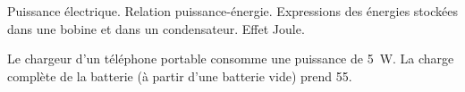 \begin{prerequis}
	Puissance électrique. Relation puissance-énergie. Expressions des énergies stockées dans une bobine et dans un condensateur. Effet Joule.
\end{prerequis}













\hauteurLargeurCadreReponse		{8mm}{2.5cm}
\initialisationEntrainement




Le chargeur %
d'un téléphone portable consomme une puissance %
 de \SI{5}{\watt}. La charge complète de la batterie (à partir d'une batterie vide)
  prend 
\SI{55}{\min}. 

